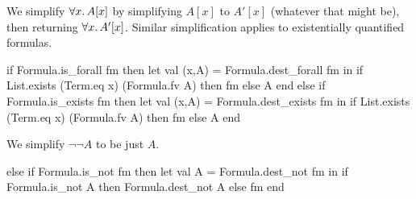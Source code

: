 \begin{node}
We simplify $\forall x\ldotp A[x]$ by simplifying $A[x]$ to $A'[x]$
(whatever that might be), then returning $\forall x\ldotp A'[x]$.
Similar simplification applies to existentially quantified formulas.
\end{node}

\nwenddocs{}\endmoddef\nwstartdeflinemarkup{}\nwenddeflinemarkup
if Formula.is_forall fm
then let val (x,A) = Formula.dest_forall fm
     in if List.exists (Term.eq x) (Formula.fv A)
        then fm
        else A
     end
else if Formula.is_exists fm
then let val (x,A) = Formula.dest_exists fm
     in if List.exists (Term.eq x) (Formula.fv A)
        then fm
        else A
     end
\nwendcode{}\nwdocspar

\begin{node}
We simplify $\neg\neg A$ to be just $A$.
\end{node}

\nwenddocs{}\endmoddef\nwstartdeflinemarkup{}\nwenddeflinemarkup
else if Formula.is_not fm
then let val A = Formula.dest_not fm
     in if Formula.is_not A
        then Formula.dest_not A
        else fm
     end
\nwendcode{}\nwdocspar

